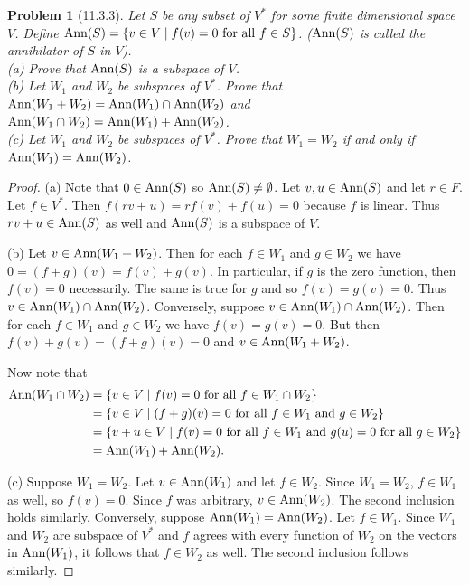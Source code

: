\documentclass{article}
\newcommand{\ann}{\textup{Ann}}
\newtheorem{problem}{Problem}
\begin{document}

\begin{problem}[11.3.3]
Let $S$ be any subset of $V^*$ for some finite dimensional space $V$. Define $\ann(S) = \{v \in V \mid f(v) = 0 \textup{ for all } f \in S\}$. ($\ann(S)$ is called the \emph{annihilator} of $S$ in $V$).\\
(a) Prove that $\ann(S)$ is a subspace of $V$.\\
(b) Let $W_1$ and $W_2$ be subspaces of $V^*$. Prove that $\ann(W_1 + W_2) = \ann(W_1) \cap \ann(W_2)$ and $\ann(W_1 \cap W_2) = \ann(W_1) + \ann(W_2)$.\\
(c) Let $W_1$ and $W_2$ be subspaces of $V^*$. Prove that $W_1 = W_2$ if and only if $\ann(W_1) = \ann(W_2)$.
\end{problem}

\begin{proof}
(a) Note that $0 \in \ann(S)$ so $\ann(S) \neq \emptyset$. Let $v,u \in \ann(S)$ and let $r \in F$. Let $f \in V^*$. Then $f(rv + u) = rf(v) + f(u) = 0$ because $f$ is linear. Thus $rv + u \in \ann(S)$ as well and $\ann(S)$ is a subspace of $V$.

(b) Let $v \in \ann(W_1 + W_2)$. Then for each $f \in W_1$ and $g \in W_2$ we have $0 = (f+g)(v) = f(v) + g(v)$. In particular, if $g$ is the zero function, then $f(v) = 0$ necessarily. The same is true for $g$ and so $f(v) = g(v) = 0$. Thus $v \in \ann(W_1) \cap \ann(W_2)$. Conversely, suppose $v \in \ann(W_1) \cap \ann(W_2)$. Then for each $f \in W_1$ and $g \in W_2$ we have $f(v) = g(v) = 0$. But then $f(v) + g(v) = (f+g)(v) = 0$ and $v \in \ann(W_1 + W_2)$.

Now note that
\begin{align*}
\ann(W_1 \cap W_2)
&= \{v \in V \mid \text{$f(v) = 0$ for all $f \in W_1 \cap W_2$}\}\\
&= \{v \in V \mid \text{$(f+g)(v) = 0$ for all $f \in W_1$ and $g \in W_2$}\}\\
&= \{v + u \in V \mid \text{$f(v) = 0$ for all $f \in W_1$ and $g(u) = 0$ for all $g \in W_2$}\}\\
&= \ann(W_1) + \ann(W_2).
\end{align*}

(c) Suppose $W_1 = W_2$. Let $v \in \ann(W_1)$ and let $f \in W_2$. Since $W_1 = W_2$, $f \in W_1$ as well, so $f(v) = 0$. Since $f$ was arbitrary, $v \in \ann(W_2)$. The second inclusion holds similarly. Conversely, suppose $\ann(W_1) = \ann(W_2)$. Let $f \in W_1$. Since $W_1$ and $W_2$ are subspace of $V^*$ and $f$ agrees with every function of $W_2$ on the vectors in $\ann(W_1)$, it follows that $f \in W_2$ as well. The second inclusion follows similarly.
\end{proof}
\end{document}
